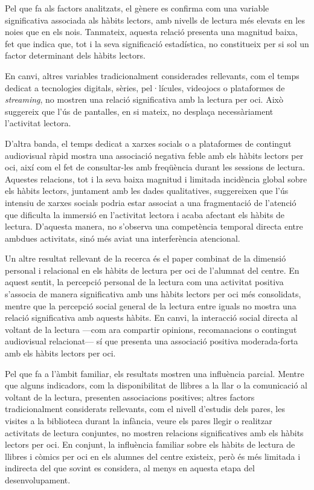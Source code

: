 \documentclass[12pt]{article}
\begin{document}
Pel que fa als factors analitzats, el gènere es confirma com una variable significativa associada als hàbits lectors, amb nivells de lectura més elevats en les noies que en els nois. Tanmateix, aquesta relació presenta una magnitud baixa, fet que indica que, tot i la seva significació estadística, no constitueix per si sol un factor determinant dels hàbits lectors.

En canvi, altres variables tradicionalment considerades rellevants, com el temps dedicat a tecnologies digitals, sèries, pel·lícules, videojocs o plataformes de \emph{streaming}, no mostren una relació significativa amb la lectura per oci. Això suggereix que l’ús de pantalles, en si mateix, no desplaça necessàriament l’activitat lectora.

D'altra banda, el temps dedicat a xarxes socials o a plataformes de contingut audiovisual ràpid mostra una associació negativa feble amb els hàbits lectors per oci, així com el fet de consultar-les amb freqüència durant les sessions de lectura. Aquestes relacions, tot i la seva baixa magnitud i limitada incidència global sobre els hàbits lectors, juntament amb les dades qualitatives, suggereixen que l'ús intensiu de xarxes socials podria estar associat a una fragmentació de l’atenció que dificulta la immersió en l’activitat lectora i acaba afectant els hàbits de lectura. D'aquesta manera, no s'observa una competència temporal directa entre ambdues activitats, sinó més aviat una interferència atencional.

Un altre resultat rellevant de la recerca és el paper combinat de la dimensió personal i relacional en els hàbits de lectura per oci de l'alumnat del centre. En aquest sentit, la percepció personal de la lectura com una activitat positiva s’associa de manera significativa amb uns hàbits lectors per oci més consolidats, mentre que la percepció social general de la lectura entre iguals no mostra una relació significativa amb aquests hàbits. En canvi, la interacció social directa al voltant de la lectura ---com ara compartir opinions, recomanacions o contingut audiovisual relacionat--- sí que presenta una associació positiva moderada-forta amb els hàbits lectors per oci.

Pel que fa a l’àmbit familiar, els resultats mostren una influència parcial. Mentre que alguns indicadors, com la disponibilitat de llibres a la llar o la comunicació al voltant de la lectura, presenten associacions positives; altres factors tradicionalment considerats rellevants, com el nivell d'estudis dels pares, les visites a la biblioteca durant la infància, veure els pares llegir o realitzar activitats de lectura conjuntes, no mostren relacions significatives amb els hàbits lectors per oci. En conjunt, la influència familiar sobre els hàbits de lectura de llibres i còmics per oci en els alumnes del centre existeix, però és més limitada i indirecta del que sovint es considera, al menys en aquesta etapa del desenvolupament.
\end{document}
